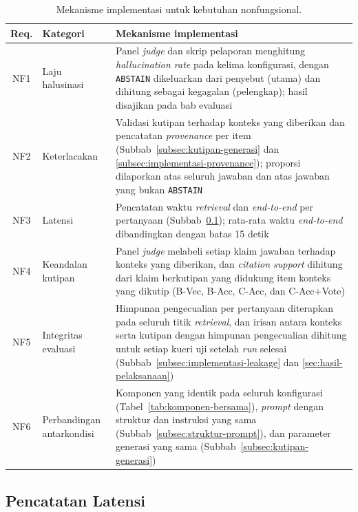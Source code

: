 \begin{table}[!htbp]
\centering
\small
\caption{Mekanisme implementasi untuk kebutuhan nonfungsional.}
\label{tab:pemenuhan-nonfungsional}
\renewcommand{\arraystretch}{1.2}
\begin{tabularx}{\textwidth}{|c|>{\raggedright\arraybackslash}p{2.6cm}|>{\raggedright\arraybackslash}X|}
\hline
\textbf{Req.} & \textbf{Kategori} & \textbf{Mekanisme implementasi} \\
\hline
NF1 & Laju halusinasi & Panel \emph{judge} dan skrip pelaporan menghitung \emph{hallucination rate} pada kelima konfigurasi, dengan \texttt{ABSTAIN} dikeluarkan dari penyebut (utama) dan dihitung sebagai kegagalan (pelengkap); hasil disajikan pada bab evaluasi \\
\hline
NF2 & Keterlacakan & Validasi kutipan terhadap konteks yang diberikan dan pencatatan \emph{provenance} per item (Subbab~\ref{subsec:kutipan-generasi} dan \ref{subsec:implementasi-provenance}); proporsi dilaporkan atas seluruh jawaban dan atas jawaban yang bukan \texttt{ABSTAIN} \\
\hline
NF3 & Latensi & Pencatatan waktu \emph{retrieval} dan \emph{end-to-end} per pertanyaan (Subbab~\ref{subsec:implementasi-latensi}); rata-rata waktu \emph{end-to-end} dibandingkan dengan batas 15 detik \\
\hline
NF4 & Keandalan kutipan & Panel \emph{judge} melabeli setiap klaim jawaban terhadap konteks yang diberikan, dan \emph{citation support} dihitung dari klaim berkutipan yang didukung item konteks yang dikutip (B-Vec, B-Acc, C-Acc, dan C-Acc+Vote) \\
\hline
NF5 & Integritas evaluasi & Himpunan pengecualian per pertanyaan diterapkan pada seluruh titik \emph{retrieval}, dan irisan antara konteks serta kutipan dengan himpunan pengecualian dihitung untuk setiap kueri uji setelah \emph{run} selesai (Subbab~\ref{subsec:implementasi-leakage} dan \ref{sec:hasil-pelaksanaan}) \\
\hline
NF6 & Perbandingan antarkondisi & Komponen yang identik pada seluruh konfigurasi (Tabel~\ref{tab:komponen-bersama}), \emph{prompt} dengan struktur dan instruksi yang sama (Subbab~\ref{subsec:struktur-prompt}), dan parameter generasi yang sama (Subbab~\ref{subsec:kutipan-generasi}) \\
\hline
\end{tabularx}
\end{table}

\subsection{Pencatatan Latensi}
\label{subsec:implementasi-latensi}

